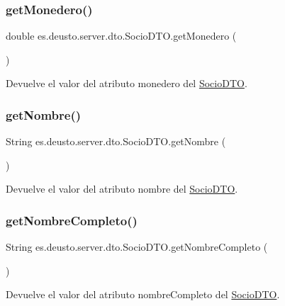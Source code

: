 \subsubsection{\texorpdfstring{getMonedero()}{getMonedero()}}
{\footnotesize\ttfamily double es.\+deusto.\+server.\+dto.\+Socio\+D\+T\+O.\+get\+Monedero (\begin{DoxyParamCaption}{ }\end{DoxyParamCaption})}

Devuelve el valor del atributo monedero del \mbox{\hyperlink{classes_1_1deusto_1_1server_1_1dto_1_1_socio_d_t_o}{Socio\+D\+TO}}. \mbox{\label{classes_1_1deusto_1_1server_1_1dto_1_1_socio_d_t_o_a25f4d6df847f79812fd20c4831871185}} 
\subsubsection{\texorpdfstring{getNombre()}{getNombre()}}
{\footnotesize\ttfamily String es.\+deusto.\+server.\+dto.\+Socio\+D\+T\+O.\+get\+Nombre (\begin{DoxyParamCaption}{ }\end{DoxyParamCaption})}

Devuelve el valor del atributo nombre del \mbox{\hyperlink{classes_1_1deusto_1_1server_1_1dto_1_1_socio_d_t_o}{Socio\+D\+TO}}. \mbox{\label{classes_1_1deusto_1_1server_1_1dto_1_1_socio_d_t_o_a75e8d9cacff9951035e80a3467b564c8}} 
\subsubsection{\texorpdfstring{getNombreCompleto()}{getNombreCompleto()}}
{\footnotesize\ttfamily String es.\+deusto.\+server.\+dto.\+Socio\+D\+T\+O.\+get\+Nombre\+Completo (\begin{DoxyParamCaption}{ }\end{DoxyParamCaption})}

Devuelve el valor del atributo nombre\+Completo del \mbox{\hyperlink{classes_1_1deusto_1_1server_1_1dto_1_1_socio_d_t_o}{Socio\+D\+TO}}. \mbox{\label{classes_1_1deusto_1_1server_1_1dto_1_1_socio_d_t_o_a3cc193371db470083d9ddd673802d20f}} 
